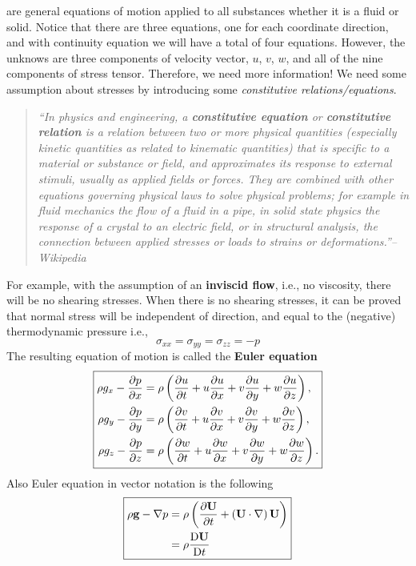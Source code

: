  are general equations of motion applied to all substances whether it is a fluid or solid.
Notice that there are three equations, one for each coordinate direction, and with continuity equation we will have a total of four equations.
However, the unknows are three components of velocity vector, \(u\), \(v\), \(w\), and all of the nine components of stress tensor.
Therefore, we need more information!
We need some assumption about stresses by introducing some \emph{constitutive relations/equations}.
%
\begin{quote}
  \itshape ``In physics and engineering, a \textbf{constitutive equation} or \textbf{constitutive relation} is a relation between two or more physical quantities (especially kinetic quantities as related to kinematic quantities) that is specific to a material or substance or field, and approximates its response to external stimuli, usually as applied fields or forces. They are combined with other equations governing physical laws to solve physical problems; for example in fluid mechanics the flow of a fluid in a pipe, in solid state physics the response of a crystal to an electric field, or in structural analysis, the connection between applied stresses or loads to strains or deformations.''--Wikipedia
\end{quote}
%
For example, with the assumption of an \textbf{inviscid flow}, i.e., no viscosity, there will be no shearing stresses.
When there is no shearing stresses, it can be proved that normal stress will be independent of direction, and equal to the (negative) thermodynamic pressure i.e.,
%
\begin{equation}
  \sigma_{xx} = \sigma_{yy} = \sigma_{zz} = -p
  \label{eq:normal-stresses-indepent-of-direction}
\end{equation}
%
The resulting equation of motion is called the \textbf{Euler equation}
%
\begin{equation}
  \boxed{
    \begin{aligned}
      \rho g_x - \frac{\partial p}{\partial x} &= \rho \left(\frac{\partial u}{\partial t} + u\frac{\partial u}{\partial x} + v\frac{\partial u}{\partial y} + w\frac{\partial u}{\partial z}\right), \\
      \rho g_y - \frac{\partial p}{\partial y} &= \rho \left(\frac{\partial v}{\partial t} + u\frac{\partial v}{\partial x} + v\frac{\partial v}{\partial y} + w\frac{\partial v}{\partial z}\right), \\
      \rho g_z - \frac{\partial p}{\partial z} &= \rho \left(\frac{\partial w}{\partial t} + u\frac{\partial w}{\partial x} + v\frac{\partial w}{\partial y} + w\frac{\partial w}{\partial z}\right).
    \end{aligned}
  }
  \label{eq:euler-equation-system-expanded}
\end{equation}
%
Also Euler equation in vector notation is the following
%
\begin{equation}
  \boxed{
    \begin{aligned}
      \rho \mathbf{g} - \mathop{}\!\nabla p &= \rho \left(\frac{\partial \mathbf{U}}{\partial t} + \left(\mathbf{U}\cdot\mathop{}\!\nabla\right)\mathbf{U}\right) \\
                             &= \rho \frac{\mathop{}\!\mathrm{D} \mathbf{U}}{\mathop{}\!\mathrm{D} t}
    \end{aligned}
  }
  \label{eq:euler-equation-system-vector-notation}
\end{equation}


